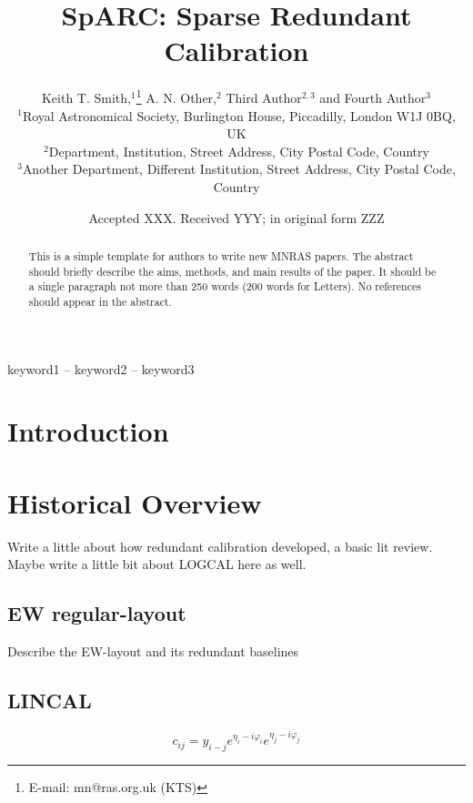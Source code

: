 \documentclass[a4paper,fleqn,usenatbib]{mnras}
\title[Sparse Redundant Calibration]{SpARC: Sparse Redundant Calibration}
\author[K. T. Smith et al.]{
Keith T. Smith,$^{1}$\thanks{E-mail: mn@ras.org.uk (KTS)}
A. N. Other,$^{2}$
Third Author$^{2,3}$
and Fourth Author$^{3}$
\\
$^{1}$Royal Astronomical Society, Burlington House, Piccadilly, London W1J 0BQ, UK\\
$^{2}$Department, Institution, Street Address, City Postal Code, Country\\
$^{3}$Another Department, Different Institution, Street Address, City Postal Code, Country
}
\date{Accepted XXX. Received YYY; in original form ZZZ}
\begin{document}
\label{firstpage}
\pagerange{\pageref{firstpage}--\pageref{lastpage}}
\maketitle

\begin{abstract}
This is a simple template for authors to write new MNRAS papers.
The abstract should briefly describe the aims, methods, and main results of the paper.
It should be a single paragraph not more than 250 words (200 words for Letters).
No references should appear in the abstract.
\end{abstract}

\begin{keywords}
keyword1 -- keyword2 -- keyword3
\end{keywords}



\section{Introduction}


\section{Historical Overview}

Write a little about how redundant calibration developed, a basic lit review.
Maybe write a little bit about LOGCAL here as well.

\subsection{EW regular-layout}
Describe the EW-layout and its redundant baselines

\subsection{LINCAL}
\begin{equation}
c_{ij} = y_{i-j} e^{\eta_i - i \varphi_i} e^{\eta_j - i \varphi_j}
\end{equation}
\end{document}
